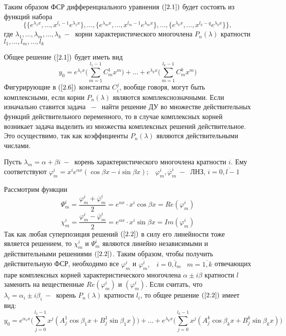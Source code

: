 Таким образом ФСР дифференциального уравнения $(\ref{2.1})$ будет состоять из функций набора
$$ \Bigg\{\{e^{\lambda_1 x},\dots ,x^{l_1-1}e^{\lambda_1 x}\},\dots,\{e^{\lambda_mx},\dots,x^{l_m-1 }e^{\lambda_mx}\},\dots,\{e^{\lambda_k x},\dots, x^{l_k-q}e^{\lambda_k x}\}\Bigg\},$$
где $\lambda_1,\dots,\lambda_m,\dots,\lambda_k~-~$ корни характеристического многочлена $P_n(\lambda)$ кратности $l_1,\dots,l_m,\dots,l_k$\par
Общее решение $(\ref{2.1})$ будет иметь вид
\begin{equation}
    \tag{2.6}
    \label{2.6}
    y_0=e^{\lambda_1x}\Big(\displaystyle\sum_{m=1}^{l_1-1}C_m^1x^m\Big)+\dots+e^{\lambda_kx}\Big(\displaystyle\sum_{m=1}^{l_k-1}C_m^kx^m\Big)
\end{equation}
Фигурирующие в $(\ref{2.6})$ константы $C_i^j$, вообще говоря, могут быть комплексными, если корни $P_n(\lambda)$ являются комплекснозначными. Если изначально ставится задача $~-~$ найти решение ДУ во множестве действительных функций действительного переменного, то в случае комплексных корней возникает задача выделить из множества комплексных решений действительное. Это осуществимо, так как коэффициенты $P_n(\lambda)$ являются действительными числами.\par
Пусть $\lambda_m=\alpha+\beta i ~-~$ корень характеристического многочлена кратности $i$. Ему соответствуют $\varphi_m^i=x^ie^{\alpha x}(\cos{\beta x}-i\sin{\beta x});\;\;\;\varphi^i_m,\overline{\varphi}_m^i~-~$ ЛНЗ, $i=\overline{0,l-1}$\par
Рассмотрим функции $$\Psi_m^i =\frac{\varphi_m^i+\overline{\varphi}_m^i}{2}=e^{\alpha x}\cdot x^i\cos{\beta x}= Re(\varphi^i_m)$$
$$\chi_m^i =\frac{\varphi_m^i-\overline{\varphi}_m^i}{2}=e^{\alpha x}\cdot x^i\sin{\beta x}= Im(\varphi^i_m)$$
Так как любая суперпозиция решений $(\ref{2.2})$ в силу его линейности тоже является решением, то $\chi_m^i$ и $\Psi_m^i$ являются линейно независимыми и действительными решениями $(\ref{2.2})$. Таким образом, чтобы получить действительную ФСР, необходимо все $\varphi_m^i$ и $\overline{\varphi_m^i},\;\;\; i=\overline{0,l_m}\;\;\;m=\overline{1,k} $ отвечающих паре комплексных корней характеристического многочлена $\alpha \pm i\beta $ кратности $l$  заменить на вещественные $Re(\varphi_m^i)$ и $(\varphi_m^i)$. Если считать, что $\lambda_i=\alpha_i\pm i\beta_i~-~$ корень $P_n(\lambda)$ кратности $l_i$, то общее решение $(\ref{2.2})$ имеет вид:
\begin{equation}
    \tag{2.7}
    \label{2.7}
    y_0=e^{\alpha_1x}\Big(\displaystyle\sum_{j=0}^{l_1-1}x^j(A^1_j\cos{\beta_1x}+B^1_j\sin{\beta_1x})\Big)+\dots +e^{\lambda_kx}\Big(\displaystyle\sum_{j=0}^{l_k-1}x^j(A_j^k\cos{\beta_kx}+B_j^k\sin{\beta_kx})\Big)
\end{equation}
